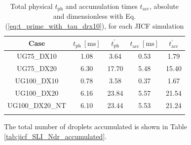 \begin{table}[!h]
\centering
\caption{Total physical $t_\mathrm{ph}$ and accumulation times $t_\mathrm{acc}$, absolute and dimensionless with Eq. (\ref{eq:t_prime_with_tau_drx10}), for each JICF simulation}
\begin{tabular}{ccccc}
\thickhline
\textbf{Case} & $t_\mathrm{ph}~[\mathrm{ms}]$ &  $t_\mathrm{ph}^{\prime}$ & $t_\mathrm{acc}~[\mathrm{ms}]$  & $t_\mathrm{acc}^{\prime}$  \\
\hline
UG75\_DX10 & 1.08 & 3.64 & 0.53 & 1.79 \\
UG75\_DX20 & 6.30 & 17.70 & 5.48  & 15.40 \\
UG100\_DX10 & 0.78  & 3.58 & 0.37 & 1.67 \\
UG100\_DX20  & 6.16 & 23.84 & 5.57 & 21.54 \\
UG100\_DX20\_NT  & 6.10  & 23.44 & 5.53 &  21.24 \\
\thickhline
\end{tabular}
\label{tab:jicf_SLI_t_prime_accumulation}
\end{table}



The total number of droplets accumulated is shown in Table \ref{tab:jicf_SLI_Ndr_accumulated}.


